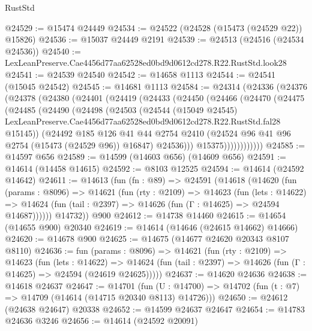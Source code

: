 \begin{lexlean}{RustStd}
\begin{coremodule}
@24529 := @15474 @24449
@24534 := @24522 (@24528 (@15473 (@24529 @22)) @15826)
@24536 := @15037 @24449 @2191
@24539 := @24513 (@24516 (@24534 @24536))
@24540 := LexLeanPreserve.Cae4456d77aa62528ed0bd9d0612cd278.R22.RustStd.look28
@24541 := @24539 @24540
@24542 := @14658 @1113
@24544 := @24541 (@15045 @24542)
@24545 := @14681 @1113
@24584 := @24314
    (@24336
      (@24376
        (@24378
          (@24380
            (@24401
              (@24419
                (@24433
                  (@24450
                    (@24466
                      (@24470
                        (@24475
                          (@24485
                            (@24490
                              (@24498
                                (@24503
                                  (@24544
                                    (@15049 @24545)
                                    LexLeanPreserve.Cae4456d77aa62528ed0bd9d0612cd278.R22.RustStd.fal28
                                    @15145))
                                (@24492
                                  @185
                                  @126
                                  @41
                                  @44
                                  @2754
                                  @2410
                                  (@24524 @96 @41 @96 @2754 (@15473 (@24529 @96)) @16847)
                                  @24536)))
                            @15375))))))))))))
@24585 := @14597 @656
@24589 := @14599 (@14603 @656) (@14609 @656)
@24591 := @14614 (@14458 @14615)
@24592 := @8103 @12525
@24594 := @14614 (@24592 @14642)
@24611 := @14613
    (fun (fn : @89) =>
    @24591
      (@14618
        (@14620
          (fun (params : @8096) =>
          @14621
            (fun (rty : @2109) =>
            @14623
              (fun (lets : @14622) =>
              @14624 (fun (tail : @2397) => @14626 (fun (Γ : @14625) => @24594 @14687))))))
        @14732))
    @900
@24612 := @14738 @14460
@24615 := @14654 (@14655 @900) @20340
@24619 := @14614 (@14646 (@24615 @14662) @14666)
@24620 := @14678 @900
@24625 := @14675 (@14677 @24620 @20343 @8107 @8110)
@24636 := fun (params : @8096) =>
  @14621
    (fun (rty : @2109) =>
    @14623
      (fun (lets : @14622) =>
      @14624 (fun (tail : @2397) => @14626 (fun (Γ : @14625) => @24594 (@24619 @24625)))))
@24637 := @14620 @24636
@24638 := @14618 @24637
@24647 := @14701
    (fun (U : @14700) => @14702 (fun (t : @7) => @14709 (@14614 (@14715 @20340 @8113) @14726)))
@24650 := @24612 (@24638 @24647) @20338
@24652 := @14599 @24637 @24647
@24654 := @14783 @24636 @3246
@24656 := @14614 (@24592 @20091)

\end{coremodule}
\end{lexlean}
